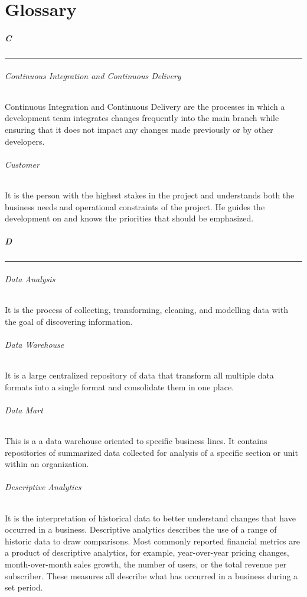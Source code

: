 \newpage
\chapter{Glossary}


\paragraph{C}
\noindent\rule{16cm}{0.4pt}

\subparagraph{Continuous Integration and Continuous Delivery}
Continuous Integration and Continuous Delivery are the processes in which a development team integrates changes frequently into the main branch while ensuring that it does not impact any changes made previously or by other developers.

\subparagraph{Customer}
It is the person with the highest stakes in the project and understands both the business needs and operational constraints of the project. He guides the development on and knows the priorities that should be emphasized.

\paragraph{D}

\noindent\rule{16cm}{0.4pt}

\subparagraph{Data Analysis}
It is the process of collecting, transforming, cleaning, and modelling data with the goal of discovering information.

\subparagraph{Data Warehouse}
It is a large centralized repository of data that transform all multiple data formats into a single format and consolidate them in one place. 

\subparagraph{Data Mart}
This is a a data warehouse oriented to specific business lines. It contains repositories of summarized data collected for analysis of a specific section or unit within an organization. 

\subparagraph{Descriptive Analytics}
It is the interpretation of historical data to better understand changes that have occurred in a business. Descriptive analytics describes the use of a range of historic data to draw comparisons. Most commonly reported financial metrics are a product of descriptive analytics, for example, year-over-year pricing changes, month-over-month sales growth, the number of users, or the total revenue per subscriber. These measures all describe what has occurred in a business during a set period.

